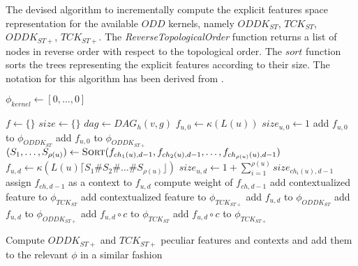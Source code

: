 \begin{algorithm}
    \caption{The devised algorithm to incrementally compute the explicit
    features space representation for the available $ODD$ kernels, namely
    $ODDK_{ST}$, $TCK_{ST}$, $ODDK_{ST+}$, $TCK_{ST+}$.
    The \emph{ReverseTopologicalOrder} function returns a list of nodes in reverse
    order with respect to the topological order.
    The $sort$ function sorts the trees representing the explicit features
    according to their size.
    The notation for this algorithm has been derived from \cite{rtesselli}.
    }
    \label{alg:incremental}
    \begin{algorithmic}[1]
            \State $\phi_{kernel} \gets [0,\dots,0]$
        \EndFor

            \State $f \gets \{\}$
            \State $size \gets \{\}$
            \State $dag \gets DAG_h(v, g)$
                        \State $f_{u,0} \gets \kappa(L(u))$
                        \State $size_{u,0} \gets 1$
                        \State add $f_{u,0}$ to $\phi_{ODDK_{ST}}$
                        \State add $f_{u,0}$ to $\phi_{ODDK_{ST+}}$
                    \Else
                        \State $(S_1,\dots,S_{\rho(u)}) \gets \Call{Sort}{
                        f_{ch_1(u),d-1},f_{ch_2(u),d-1},\dots,f_{ch_{\rho(u)}(u),d-1}}$
                        \State $f_{u,d} \gets \kappa(L(u)\lceil{}S_1\#S_2\#\dots\#S_{\rho(u)}\rfloor)$
                        \State $size_{u,d} \gets 1 + \sum_{i=1}^{\rho(u)}size_{ch_i(u),d-1}$
                            \State assign $f_{ch,d-1}$ as a context to $f_{u,d}$
                            \State compute weight of $f_{ch,d-1}$
                            \State add contextualized feature to $\phi_{TCK_{ST}}$
                            \State add contextualized feature to $\phi_{TCK_{ST+}}$
                        \EndFor
                        \State add $f_{u,d}$ to $\phi_{ODDK_{ST}}$
                        \State add $f_{u,d}$ to $\phi_{ODDK_{ST+}}$
                    \EndIf
                        \State add $f_{u,d}\circ{}c$ to $\phi_{TCK_{ST}}$
                        \State add $f_{u,d}\circ{}c$ to $\phi_{TCK_{ST+}}$
                    \EndIf

                    \State Compute $ODDK_{ST+}$ and $TCK_{ST+}$ peculiar features
                    and contexts and add them to the relevant $\phi$ in a similar
                    fashion\label{line:stp}
                \EndFor
            \EndFor
        \EndFor
    \end{algorithmic}
\end{algorithm}

